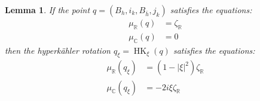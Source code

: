 \documentclass[12pt,oneside,reqno]{amsart}
\newtheorem{lemma}[theorem]{Lemma}
\theoremstyle{definition}
\numberwithin{equation}{section}
\numberwithin{theorem}{section}
\newcommand{\R}{\mathbb{R}}
\newcommand{\C}{\mathbb{C}}
\newcommand{\HK}{\operatorname{HK}}
\begin{document}
\begin{lemma}
    If the point $q=(B_h,i_k,B_{\bar{h}},j_k )$ satisfies the equations:
%
\begin{equation}\label{initial}
\begin{split}
    \mu_\R(q) &=\zeta_\R \\
    \mu_\C(q) &=0
    \end{split}
    \end{equation}
%    
    then the hyperk\"ahler rotation $q_\xi=\HK_\xi(q)$ satisfies the equations:
    \begin{equation}\label{hr}
    \begin{split}
        \mu_\R(q_\xi) &=(1-\lvert\xi \rvert^2)\zeta_\R \\
        \mu_\C(q_\xi) &= -2i\xi\zeta_\R  
    \end{split}       
    \end{equation}
% 
\end{lemma}
%
\end{document}
